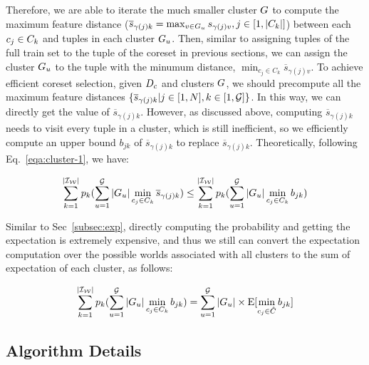 Therefore,  we are able to iterate the much smaller cluster $G$ to compute  the maximum feature distance (\ie $\overline{s}_{\gamma(j)k} = \max_{v \in G_u}s_{\gamma(j)v}, j \in [1,|C_k|]$) between each $c_j \in C_k$ and tuples in each cluster $G_u$. Then, similar to assigning tuples of the full train set to the tuple of the coreset in previous sections, we can assign the cluster $G_u$ to the tuple  with the minumum distance, \ie $\min_{c_j\in C_k} \overline{s}_{\gamma(j)v}$. To achieve efficient coreset selection, given $D_c$ and clusters $G$, we should precompute all the maximum feature distances $\{\overline{s}_{\gamma(j)k}|j \in [1,N], k \in [1,\mathcal{G}]\}$. In this way, we can directly get the value of $\overline{s}_{\gamma(j)k}$. However, as discussed above, computing $\overline{s}_{\gamma(j)k}$ needs to visit every tuple in a cluster, which is still inefficient, so we  efficiently compute an upper bound $b_{jk}$ of  $\overline{s}_{\gamma(j)k}$ to replace $\overline{s}_{\gamma(j)k}$. Theoretically, following Eq.~\ref{eqa:cluster-1}, we have:

\begin{equation}\label{eqa:cluster-3}
    \begin{aligned}
        \sum_{k= 1}^{|\mathcal{I_W}|} p_k (\sum_{u=1}^{\mathcal{G}} |G_u| \min_{c_j\in C_k} \overline{s}_{\gamma(j)k}) \leq \sum_{k= 1}^{|\mathcal{I_W}|} p_k (\sum_{u=1}^{\mathcal{G}} |G_u| \min_{c_j\in C_k} b_{jk})
    \end{aligned}
\end{equation}

Similar to Sec~\ref{subsec:exp}, directly computing the probability and getting the expectation is extremely expensive, and thus we still can convert the expectation computation over the possible worlds associated with all clusters to the sum of expectation of each cluster, as follows:

\begin{equation}\label{eqa:cluster-4}
    \begin{aligned}
        \sum_{k= 1}^{|\mathcal{I_W}|} p_k (\sum_{u=1}^{\mathcal{G}} |G_u| \min_{c_j\in C_k} b_{jk}) = \sum_{u=1}^{\mathcal{G}}  |G_u| \times\mathrm{E}[\min_{c_j\in \hat{C}}b_{jk}]
    \end{aligned}
\end{equation}

\subsection{Algorithm Details}


